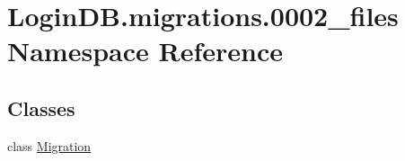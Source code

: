 \hypertarget{namespace_login_d_b_1_1migrations_1_10002__files}{}\section{Login\+D\+B.\+migrations.0002\+\_\+files Namespace Reference}
\label{namespace_login_d_b_1_1migrations_1_10002__files}
\subsection*{Classes}
\begin{DoxyCompactItemize}
\item 
class \hyperlink{class_login_d_b_1_1migrations_1_10002__files_1_1_migration}{Migration}
\end{DoxyCompactItemize}
